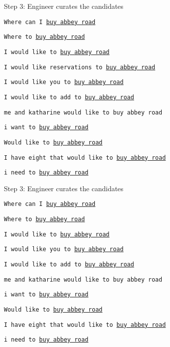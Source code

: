 \documentclass[12pt]{beamer}
\begin{document}
\begin{frame}{Step 3: Engineer curates the candidates}

    \texttt{Where can I \underline{buy abbey road}}

    \texttt{Where to \underline{buy abbey road}}

    \texttt{I would like to \underline{buy abbey road}}

    {\color{red}\texttt{I would like reservations to \underline{buy abbey road}}}

    \texttt{I would like you to \underline{buy abbey road}}

    \texttt{I would like to add to \underline{buy abbey road}}

    \texttt{me and katharine would like to buy abbey road}

    \texttt{i want to \underline{buy abbey road}}

    \texttt{Would like to \underline{buy abbey road}}

    \texttt{I have eight that would like to \underline{buy abbey road}}

    \texttt{i need to \underline{buy abbey road}}

\end{frame}

\begin{frame}{Step 3: Engineer curates the candidates}

  \texttt{Where can I \underline{buy abbey road}}

  \texttt{Where to \underline{buy abbey road}}

  \texttt{I would like to \underline{buy abbey road}}

  \bigskip 

  \texttt{I would like you to \underline{buy abbey road}}

  \texttt{I would like to add to \underline{buy abbey road}}

  \texttt{me and katharine would like to buy abbey road}

  \texttt{i want to \underline{buy abbey road}}

  \texttt{Would like to \underline{buy abbey road}}

  \texttt{I have eight that would like to \underline{buy abbey road}}

  \texttt{i need to \underline{buy abbey road}}

\end{frame}
\end{document}
